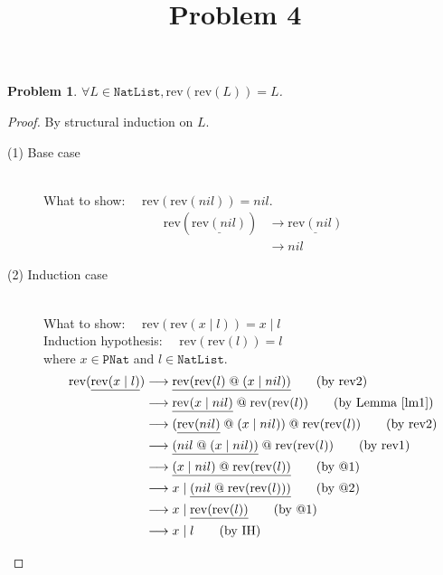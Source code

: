 \documentclass[12pt, a4paper]{article}
\title{Problem 4}
\date{\vspace{-5ex}}
\newtheorem{problem}{Problem}
\newcommand{\rel}[1]{\mathrel{#1}}
\newcommand{\rmx}[1]{\mathrm{#1}}
\newcommand{\larrow}{\longrightarrow}
\newcommand{\under}{\underline}
\begin{document}
\maketitle

\begin{problem}
$\forall L \in \mathtt{NatList}, \rmx{rev}(\rmx{rev}(L)) = L$.
\end{problem}
\begin{proof}
By structural induction on $L$.

\begin{description}
\item[(1) Base case]~\\
\noindent
What to show: $\quad\rmx{rev}(\rmx{rev}(nil)) = nil$.
\begin{align*}
\rmx{rev}(\under{\rmx{rev}(nil)})
	&\larrow \under{\rmx{rev}(nil)} \tag{by rev1} \\
	&\larrow nil \tag{by rev1}
\end{align*}

\item[(2) Induction case]~\\
What to show: $\quad \rmx{rev}(\rmx{rev}(x \rel{|} l)) = x \rel{|} l$ \\
Induction hypothesis: $\quad \rmx{rev}(\rmx{rev}(l)) = l$  \\
where $x \in \mathtt{PNat}$ and $l \in \mathtt{NatList}$.
\begin{align*}
\rmx{rev}(\under{\rmx{rev}(x \rel{|} l)})
	&\larrow \under{\rmx{rev}(\rmx{rev}(l) \rel{@} (x \rel{|} nil))} \tag{by rev2} \\
	&\larrow \under{\rmx{rev}(x \rel{|} nil)} \rel{@} \rmx{rev}(\rmx{rev}(l)) \tag{by Lemma~\ref{lm1}} \\
	&\larrow (\under{\rmx{rev}(nil)} \rel{@} (x \rel{|} nil)) \rel{@} \rmx{rev}(\rmx{rev}(l)) \tag{by rev2} \\
	&\larrow \under{(nil \rel{@} (x \rel{|} nil))} \rel{@} \rmx{rev}(\rmx{rev}(l)) \tag{by rev1} \\
	&\larrow \under{(x \rel{|} nil) \rel{@} \rmx{rev}(\rmx{rev}(l))} \tag{by @1} \\
	&\larrow x \rel{|} \under{(nil \rel{@} \rmx{rev}(\rmx{rev}(l)))} \tag{by @2} \\
	&\larrow x \rel{|} \under{\rmx{rev}(\rmx{rev}(l))} \tag{by @1} \\
	&\larrow x \rel{|} l \tag{by IH}
\end{align*}

\end{description}

\end{proof}
\end{document}
